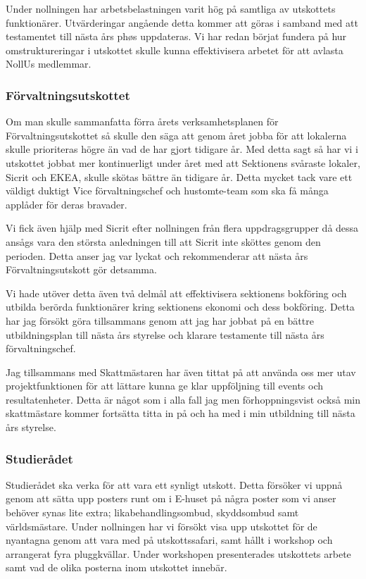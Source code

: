 \documentclass[../_main/handlingar.tex]{subfiles}
\begin{document}
Under nollningen har arbetsbelastningen varit hög på samtliga av utskottets funktionärer. Utvärderingar angående detta kommer att göras i samband med att testamentet till nästa års phøs uppdateras. Vi har redan börjat fundera på hur omstruktureringar i utskottet skulle kunna effektivisera arbetet för att avlasta NollUs medlemmar. 


\subsubsection*{Förvaltningsutskottet}

Om man skulle sammanfatta förra årets verksamhetsplanen för Förvaltningsutskottet så skulle den säga att genom året jobba för att lokalerna skulle prioriteras högre än vad de har gjort tidigare år. Med detta sagt så har vi i utskottet jobbat mer kontinuerligt under året med att Sektionens svåraste lokaler, Sicrit och EKEA, skulle skötas bättre än tidigare år. Detta mycket tack vare ett väldigt duktigt Vice förvaltningschef och hustomte-team som ska få många applåder för deras bravader. 

Vi fick även hjälp med Sicrit efter nollningen från flera uppdragsgrupper då dessa ansågs vara den största anledningen till att Sicrit inte sköttes genom den perioden. Detta anser jag var lyckat och rekommenderar att nästa års Förvaltningsutskott gör detsamma.

Vi hade utöver detta även två delmål att effektivisera sektionens bokföring och utbilda berörda funktionärer kring sektionens ekonomi och dess bokföring. Detta har jag försökt göra tillsammans genom att jag har jobbat på en bättre utbildningsplan till nästa års styrelse och klarare testamente till nästa års förvaltningschef. 

Jag tillsammans med Skattmästaren har även tittat på att använda oss mer utav projektfunktionen för att lättare kunna ge klar uppföljning till events och resultatenheter. Detta är något som i alla fall jag men förhoppningsvist också min skattmästare kommer fortsätta titta in på och ha med i min utbildning till nästa års styrelse.


\subsubsection*{Studierådet}

Studierådet ska verka för att vara ett synligt utskott. Detta försöker vi uppnå genom att sätta upp posters runt om i E-huset på några poster som vi anser behöver synas lite extra; likabehandlingsombud, skyddsombud samt världsmästare. Under nollningen har vi försökt visa upp utskottet för de nyantagna genom att vara med på utskottssafari, samt hållt i workshop och arrangerat fyra pluggkvällar. Under workshopen presenterades utskottets arbete samt vad de olika posterna inom utskottet innebär. 
\end{document}
